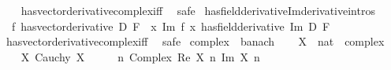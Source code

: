 \begin{isabellebody}
%
\isadelimproof
\ \ %
\endisadelimproof
%
\isatagproof
{}\isamarkupfalse%
\ has{\isacharunderscore}{\kern0pt}vector{\isacharunderscore}{\kern0pt}derivative{\isacharunderscore}{\kern0pt}complex{\isacharunderscore}{\kern0pt}iff\ \isamarkupfalse%
\ safe%
\endisatagproof
{\isafoldproof}%
%
\isadelimproof
\isanewline
%
\endisadelimproof
\isanewline
{}\isamarkupfalse%
\ has{\isacharunderscore}{\kern0pt}field{\isacharunderscore}{\kern0pt}derivative{\isacharunderscore}{\kern0pt}Im{\isacharbrackleft}{\kern0pt}derivative{\isacharunderscore}{\kern0pt}intros{\isacharbrackright}{\kern0pt}{\isacharcolon}{\kern0pt}\isanewline
\ \ {\isachardoublequoteopen}{\isacharparenleft}{\kern0pt}f\ has{\isacharunderscore}{\kern0pt}vector{\isacharunderscore}{\kern0pt}derivative\ D{\isacharparenright}{\kern0pt}\ F\ {\isasymLongrightarrow}\ {\isacharparenleft}{\kern0pt}{\isacharparenleft}{\kern0pt}{\isasymlambda}x{\isachardot}{\kern0pt}\ Im\ {\isacharparenleft}{\kern0pt}f\ x{\isacharparenright}{\kern0pt}{\isacharparenright}{\kern0pt}\ has{\isacharunderscore}{\kern0pt}field{\isacharunderscore}{\kern0pt}derivative\ {\isacharparenleft}{\kern0pt}Im\ D{\isacharparenright}{\kern0pt}{\isacharparenright}{\kern0pt}\ F{\isachardoublequoteclose}\isanewline
%
\isadelimproof
\ \ %
\endisadelimproof
%
\isatagproof
{}\isamarkupfalse%
\ has{\isacharunderscore}{\kern0pt}vector{\isacharunderscore}{\kern0pt}derivative{\isacharunderscore}{\kern0pt}complex{\isacharunderscore}{\kern0pt}iff\ \isamarkupfalse%
\ safe%
\endisatagproof
{\isafoldproof}%
%
\isadelimproof
\isanewline
%
\endisadelimproof
\isanewline
{}\isamarkupfalse%
\ complex\ {\isacharcolon}{\kern0pt}{\isacharcolon}{\kern0pt}\ banach\isanewline
%
\isadelimproof
%
\endisadelimproof
%
\isatagproof
{}\isamarkupfalse%
\isanewline
\ \ \isamarkupfalse%
\ X\ {\isacharcolon}{\kern0pt}{\isacharcolon}{\kern0pt}\ {\isachardoublequoteopen}nat\ {\isasymRightarrow}\ complex{\isachardoublequoteclose}\isanewline
\ \ \isamarkupfalse%
\ X{\isacharcolon}{\kern0pt}\ {\isachardoublequoteopen}Cauchy\ X{\isachardoublequoteclose}\isanewline
\ \ \isamarkupfalse%
\ \isamarkupfalse%
\ {\isachardoublequoteopen}{\isacharparenleft}{\kern0pt}{\isasymlambda}n{\isachardot}{\kern0pt}\ Complex\ {\isacharparenleft}{\kern0pt}Re\ {\isacharparenleft}{\kern0pt}X\ n{\isacharparenright}{\kern0pt}{\isacharparenright}{\kern0pt}\ {\isacharparenleft}{\kern0pt}Im\ {\isacharparenleft}{\kern0pt}X\ n{\isacharparenright}{\kern0pt}{\isacharparenright}{\kern0pt}{\isacharparenright}{\kern0pt}\ {\isasymlonglonglongrightarrow}\isanewline

\end{isabellebody}

